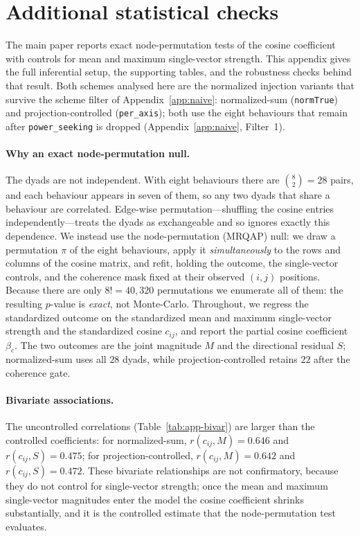 
\section{Additional statistical checks}
\label{app:stats}

The main paper reports exact node-permutation tests of the cosine coefficient with
controls for mean and maximum single-vector strength. This appendix gives the full
inferential setup, the supporting tables, and the robustness checks behind that result.
Both schemes analysed here are the normalized injection variants that survive the scheme
filter of Appendix~\ref{app:naive}: normalized-sum (\texttt{normTrue}) and
projection-controlled (\texttt{per\_axis}); both use the eight behaviours that remain after
\texttt{power\_seeking} is dropped (Appendix~\ref{app:naive}, Filter~1).

\paragraph{Why an exact node-permutation null.}
The dyads are not independent. With eight behaviours there are $\binom{8}{2}=28$ pairs, and
each behaviour appears in seven of them, so any two dyads that share a behaviour are
correlated. Edge-wise permutation---shuffling the cosine entries independently---treats the
dyads as exchangeable and so ignores exactly this dependence. We instead use the
node-permutation (MRQAP) null: we draw a permutation $\pi$ of the eight behaviours, apply it
\emph{simultaneously} to the rows and columns of the cosine matrix, and refit, holding the
outcome, the single-vector controls, and the coherence mask fixed at their observed $(i,j)$
positions. Because there are only $8!=40{,}320$ permutations we enumerate all of them: the
resulting $p$-value is \emph{exact}, not Monte-Carlo. Throughout, we regress the standardized
outcome on the standardized mean and maximum single-vector strength and the standardized
cosine $c_{ij}$, and report the partial cosine coefficient $\beta_c$. The two outcomes are the
joint magnitude $M$ and the directional residual $S$; normalized-sum uses all $28$ dyads,
while projection-controlled retains $22$ after the coherence gate.

\paragraph{Bivariate associations.}
The uncontrolled correlations (Table~\ref{tab:app-bivar}) are larger than the controlled
coefficients: for normalized-sum, $r(c_{ij},M)=0.646$ and $r(c_{ij},S)=0.475$; for
projection-controlled, $r(c_{ij},M)=0.642$ and $r(c_{ij},S)=0.472$. These bivariate
relationships are not confirmatory, because they do not control for single-vector strength;
once the mean and maximum single-vector magnitudes enter the model the cosine coefficient
shrinks substantially, and it is the controlled estimate that the node-permutation test
evaluates.

